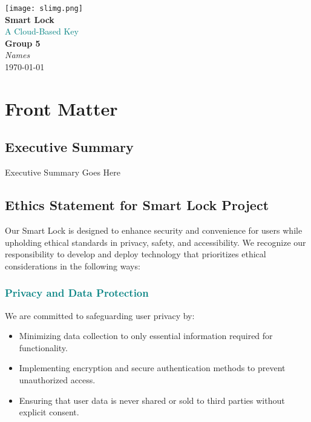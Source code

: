 \documentclass[a4paper,12pt]{report}
\begin{document}
\begin{titlepage}
    \begin{center}
        \vspace*{2cm}

        \texttt{[image: slimg.png]}\\[1cm]

        {\Huge \textbf{Smart Lock}}\\[0.5cm]
        {\textcolor{teal}{\Large A Cloud-Based Key}}\\[1.5cm]

        {\LARGE \textbf{Group 5}}\\[0.5cm]
        {\Large \textit{Names}}\\[2cm]

        {\Large \today}
    \end{center}
\end{titlepage}

\newpage
{}
\pagestyle{fancy}      

\section{Front Matter}
\subsection{Executive Summary}
Executive Summary Goes Here


\subsection{Ethics Statement for Smart Lock Project}
Our Smart Lock is designed to enhance security and convenience for users while upholding ethical standards in privacy, safety, and accessibility. We recognize our responsibility to develop and deploy technology that prioritizes ethical considerations in the following ways:

\textcolor{teal}{\subsubsection{Privacy and Data Protection}}
We are committed to safeguarding user privacy by:
\begin{itemize}
    \item Minimizing data collection to only essential information required for functionality.
    \item Implementing encryption and secure authentication methods to prevent unauthorized access.
    \item Ensuring that user data is never shared or sold to third parties without explicit consent.
\end{itemize}
\end{document}
